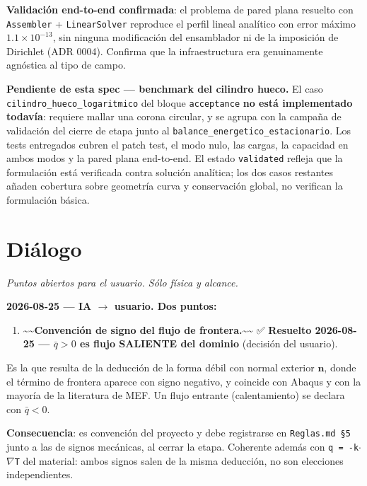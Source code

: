 \documentclass[11pt,letterpaper,oneside]{report}
\begin{document}
\textbf{Validación end-to-end confirmada}: el problema de pared plana resuelto con \texttt{Assembler} + \texttt{LinearSolver} reproduce el perfil lineal analítico con error máximo $1.1\times10^{-13}$, sin ninguna modificación del ensamblador ni de la imposición de Dirichlet (ADR 0004). Confirma que la infraestructura era genuinamente agnóstica al tipo de campo.

\textbf{Pendiente de esta spec --- benchmark del cilindro hueco.} El caso \texttt{cilindro\_hueco\_logaritmico} del bloque \texttt{acceptance} \textbf{no está implementado todavía}: requiere mallar una corona circular, y se agrupa con la campaña de validación del cierre de etapa junto al \texttt{balance\_energetico\_estacionario}. Los tests entregados cubren el patch test, el modo nulo, las cargas, la capacidad en ambos modos y la pared plana end-to-end. El estado \texttt{validated} refleja que la formulación está verificada contra solución analítica; los dos casos restantes añaden cobertura sobre geometría curva y conservación global, no verifican la formulación básica.


\section{Diálogo}

\textit{Puntos abiertos para el usuario. Sólo física y alcance.}

\textbf{2026-08-25 --- IA \ensuremath{\to} usuario. Dos puntos:}

\begin{enumerate}
  \item \textasciitilde{}\textasciitilde{}\textbf{Convención de signo del flujo de frontera.}\textasciitilde{}\textasciitilde{} ✅ \textbf{Resuelto 2026-08-25 --- $\bar q > 0$ es flujo SALIENTE del dominio} (decisión del usuario).
\end{enumerate}

   Es la que resulta de la deducción de la forma débil con normal exterior $\mathbf n$, donde el término de frontera aparece con signo negativo, y coincide con Abaqus y con la mayoría de la literatura de MEF. Un flujo entrante (calentamiento) se declara con $\bar q < 0$.

   \textbf{Consecuencia}: es convención del proyecto y debe registrarse en \texttt{Reglas.md §5} junto a las de signos mecánicas, al cerrar la etapa. Coherente además con \texttt{q = -k\ensuremath{\cdot}\ensuremath{\nabla}T} del material: ambos signos salen de la misma deducción, no son elecciones independientes.
\end{document}
